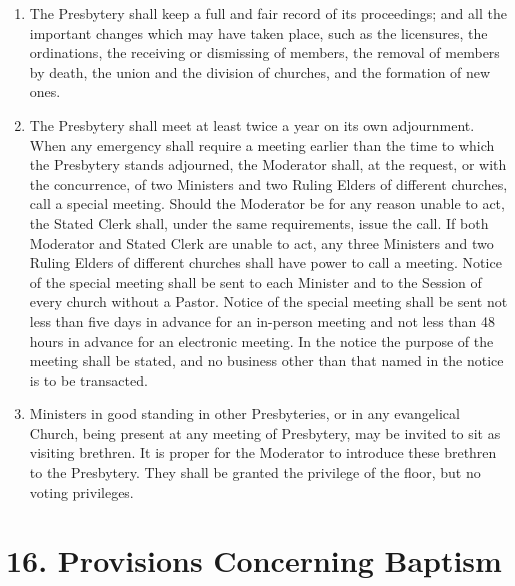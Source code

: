 \documentclass[
]{book}
\begin{document}
\begin{enumerate}
\item
  \protect\hypertarget{15.9}{\href{}{}}The Presbytery shall keep a full and fair record of its proceedings; and all the important changes which may have taken place, such as the licensures, the ordinations, the receiving or dismissing of members, the removal of members by death, the union and the division of churches, and the formation of new ones.
\item
  The Presbytery shall meet at least twice a year on its own adjournment. When any emergency shall require a meeting earlier than the time to which the Presbytery stands adjourned, the Moderator shall, at the request, or with the concurrence, of two Ministers and two Ruling Elders of different churches, call a special meeting. Should the Moderator be for any reason unable to act, the Stated Clerk shall, under the same requirements, issue the call. If both Moderator and Stated Clerk are unable to act, any three Ministers and two Ruling Elders of different churches shall have power to call a meeting. Notice of the special meeting shall be sent to each Minister and to the Session of every church without a Pastor. Notice of the special meeting shall be sent not less than five days in advance for an in-person meeting and not less than 48 hours in advance for an electronic meeting. In the notice the purpose of the meeting shall be stated, and no business other than that named in the notice is to be transacted.
\item
  Ministers in good standing in other Presbyteries, or in any evangelical Church, being present at any meeting of Presbytery, may be invited to sit as visiting brethren. It is proper for the Moderator to introduce these brethren to the Presbytery. They shall be granted the privilege of the floor, but no voting privileges.
\end{enumerate}

\hypertarget{provisions-concerning-baptism}{%
\section*{16. Provisions Concerning Baptism}\label{provisions-concerning-baptism}}

\protect\hypertarget{chapter-slug-16-provisions-concerning-baptism}{\href{}{}}
\end{document}
